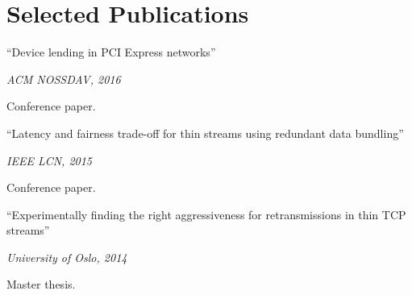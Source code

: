 \section{Selected Publications}
\parbox[t][][t]{\linewidth}{
	\parbox{\linewidth}{{``Device lending in PCI Express networks''}}
	\smallbreak
	\parbox{\linewidth}{\emph{ACM NOSSDAV, 2016}}
	\smallbreak
	Conference paper.
	\bigbreak
}

\parbox[t][][t]{\linewidth}{
	\parbox{\linewidth}{{``Latency and fairness trade-off for thin
	streams using redundant data bundling''}}
	\smallbreak
	\parbox{\linewidth}{\emph{IEEE LCN, 2015}}
	\smallbreak
	Conference paper.
	\bigbreak
}

\parbox[t][][t]{\linewidth}{
	\parbox{\linewidth}{{``Experimentally finding the right aggressiveness
	for retransmissions in thin TCP streams''}}
	\smallbreak
	\parbox{\linewidth}{\emph{University of Oslo, 2014}}
	\smallbreak
	Master thesis.
	\bigbreak
}
